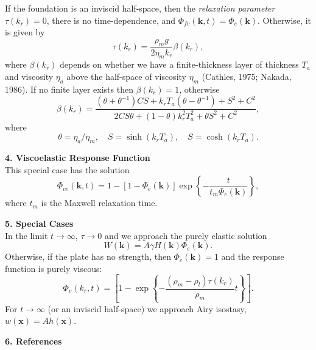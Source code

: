 \documentclass[12pt]{article}
\begin{document}
If the foundation is an inviscid half-space, then the {\it relaxation parameter} $\tau(k_r) = 0$, there is no time-dependence,
and $\Phi_{fv}(\mathbf{k},t) = \Phi_e(\mathbf{k})$. Otherwise, it is given by
\begin{equation}
\tau(k_r) = \frac{\rho_m g}{2 \eta_m k_r} \beta(k_r),
\label{eq:Eq_10}
\end{equation}
where $\beta(k_r)$ depends on whether we have a finite-thickness layer of thickness $T_a$ and viscosity
$\eta_a$ above the half-space of viscosity $\eta_m$ (Cathles, 1975; Nakada, 1986).
If no finite layer exists then $\beta(k_r) = 1$, otherwise
\begin{equation}
\beta(k_r) = \frac{(\theta + \theta^{-1}) CS + k_r T_a (\theta - \theta^{-1}) + S^2 + C^2}{2CS\theta + (1-\theta)k_r^2 T_a^2 + \theta S^2 + C^2},
\label{eq:Eq_11}
\end{equation}
where
\begin{equation}
\theta = \eta_a/\eta_m, \quad S = \sinh (k_r T_a), \quad S = \cosh (k_r T_a).
\label{eq:Eq_12}
\end{equation}

{\center \bf 4. Viscoelastic Response Function}\\

This special case has the solution
\begin{equation}
\Phi_{ve}(\mathbf{k},t) = 1 - \left [ 1 - \Phi_e(\mathbf{k}) \right ] \exp \left \{ - \frac{t }{t_m \Phi_e(\mathbf{k})} \right \},
\end{equation}
where $t_m$ is the Maxwell relaxation time.

{\center \bf 5. Special Cases}\\

\noindent
In the limit $t \rightarrow \infty$, $\tau  \rightarrow0$ and we approach the purely elastic solution
\begin{equation}
W(\mathbf{k}) = A \gamma H(\mathbf{k}) \Phi_e(\mathbf{k}).
\label{eq:Eq21}
\end{equation}
Otherwise, if the plate has no strength, then $\Phi_e(\mathbf{k}) = 1$ and the response function is {purely viscous}:
\begin{equation}
\Phi_v(k_r,t) = \left [ 1 - \exp \left \{ - \frac{(\rho_m - \rho_l) \tau(k_r)}{\rho_m} t \right \} \right ].
\label{eq:Eq19b}
\end{equation}
For $t \rightarrow \infty$ (or an inviscid half-space) we approach Airy isostasy, $w(\mathbf{x}) = A h(\mathbf{x})$.

{\center \bf 6. References}\\
\end{document}
